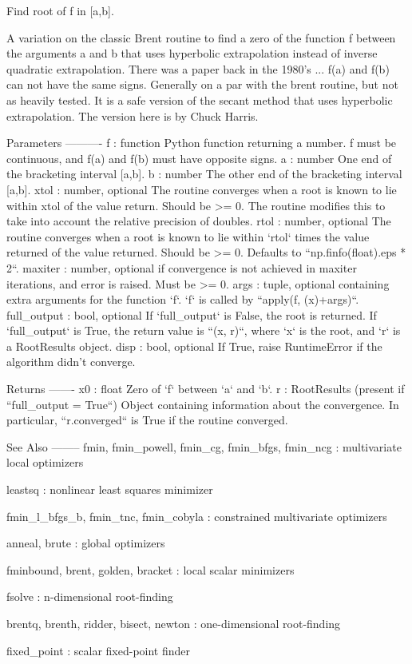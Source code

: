 \begin{DoxyVerb}Find root of f in [a,b].

A variation on the classic Brent routine to find a zero of the function f
between the arguments a and b that uses hyperbolic extrapolation instead of
inverse quadratic extrapolation. There was a paper back in the 1980's ...
f(a) and f(b) can not have the same signs. Generally on a par with the
brent routine, but not as heavily tested.  It is a safe version of the
secant method that uses hyperbolic extrapolation. The version here is by
Chuck Harris.

Parameters
----------
f : function
    Python function returning a number.  f must be continuous, and f(a) and
    f(b) must have opposite signs.
a : number
    One end of the bracketing interval [a,b].
b : number
    The other end of the bracketing interval [a,b].
xtol : number, optional
    The routine converges when a root is known to lie within xtol of the
    value return. Should be >= 0.  The routine modifies this to take into
    account the relative precision of doubles.
rtol : number, optional
    The routine converges when a root is known to lie within `rtol` times
    the value returned of the value returned. Should be >= 0. Defaults to
    ``np.finfo(float).eps * 2``.
maxiter : number, optional
    if convergence is not achieved in maxiter iterations, and error is
    raised.  Must be >= 0.
args : tuple, optional
    containing extra arguments for the function `f`.
    `f` is called by ``apply(f, (x)+args)``.
full_output : bool, optional
    If `full_output` is False, the root is returned.  If `full_output` is
    True, the return value is ``(x, r)``, where `x` is the root, and `r` is
    a RootResults object.
disp : bool, optional
    If True, raise RuntimeError if the algorithm didn't converge.

Returns
-------
x0 : float
    Zero of `f` between `a` and `b`.
r : RootResults (present if ``full_output = True``)
    Object containing information about the convergence.  In particular,
    ``r.converged`` is True if the routine converged.

See Also
--------
fmin, fmin_powell, fmin_cg,
       fmin_bfgs, fmin_ncg : multivariate local optimizers

leastsq : nonlinear least squares minimizer

fmin_l_bfgs_b, fmin_tnc, fmin_cobyla : constrained multivariate optimizers

anneal, brute : global optimizers

fminbound, brent, golden, bracket : local scalar minimizers

fsolve : n-dimensional root-finding

brentq, brenth, ridder, bisect, newton : one-dimensional root-finding

fixed_point : scalar fixed-point finder\end{DoxyVerb}
 \hypertarget{namespacescipy_1_1optimize_1_1zeros_ad80f0ae5fa1147fe0c77cd6159380b59}{}
